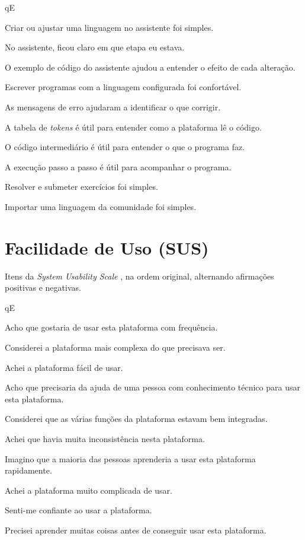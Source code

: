 \begin{questoes}{qE}
    \item\label{qE:recursos-ini} Criar ou ajustar uma linguagem no assistente foi simples.
    \item No assistente, ficou claro em que etapa eu estava.
    \item O exemplo de código do assistente ajudou a entender o efeito de cada alteração.
    \item Escrever programas com a linguagem configurada foi confortável.
    \item As mensagens de erro ajudaram a identificar o que corrigir.
    \item A tabela de \textit{tokens} é útil para entender como a plataforma lê o código.
    \item O código intermediário é útil para entender o que o programa faz.
    \item A execução passo a passo é útil para acompanhar o programa.
    \item Resolver e submeter exercícios foi simples.
    \item\label{qE:recursos-fim} Importar uma linguagem da comunidade foi simples.
\end{questoes}


\section{Facilidade de Uso (SUS)}

Itens da \textit{System Usability Scale} \cite{brooke1996}, na ordem original, alternando afirmações positivas e negativas.


\begin{questoes}{qE}
    \item\label{qE:sus-ini} Acho que gostaria de usar esta plataforma com frequência.
    \item Considerei a plataforma mais complexa do que precisava ser.
    \item Achei a plataforma fácil de usar.
    \item Acho que precisaria da ajuda de uma pessoa com conhecimento técnico para usar esta plataforma.
    \item Considerei que as várias funções da plataforma estavam bem integradas.
    \item Achei que havia muita inconsistência nesta plataforma.
    \item Imagino que a maioria das pessoas aprenderia a usar esta plataforma rapidamente.
    \item Achei a plataforma muito complicada de usar.
    \item Senti-me confiante ao usar a plataforma.
    \item\label{qE:sus-fim} Precisei aprender muitas coisas antes de conseguir usar esta plataforma.
\end{questoes}


